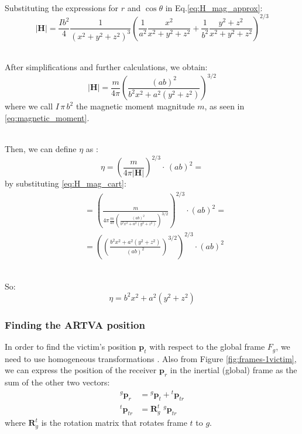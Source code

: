 \documentclass[main]{subfiles}
\begin{document}
\noindent\\
Substituting the expressions for \(r\) and \(\cos\theta\) in Eq.\ref{eq:H_mag_approx}:
\[
\left| \mathbf{H} \right| = \frac{I b^2}{4} \frac{1}{(x^2 + y^2 + z^2)^{3}} \left(\frac{1}{a^2} \frac{x^2}{x^2 + y^2 + z^2} + \frac{1}{b^2} \frac{y^2 + z^2}{x^2 + y^2 + z^2}\right)^{2/3}
\]

\noindent\\
After simplifications and further calculations, we obtain:
\begin{equation}
    \left| \mathbf{H} \right| = \frac{m}{4 \pi} \left(\frac{(ab)^2}{b^2 x^2 + a^2 (y^2 + z^2)}\right)^{3/2}
    \label{eq:H_mag_cart}
\end{equation}
where we call $I \, \pi \, b^2$ the magnetic moment magnitude $m$, as seen in \ref{eq:magnetic_moment}.

\noindent\\
Then, we can define $\eta$ as \cite{main}:
\[ \eta = \left( \frac{m}{4 \pi \left| \mathbf{H} \right|} \right)^{2/3} \cdot \, (ab)^2 = \]
by substituting \ref{eq:H_mag_cart}:
\[
\begin{aligned}
&= \left( \frac{m}{4 \pi \frac{m}{4 \pi} \left(\frac{(ab)^2}{b^2 x^2 + a^2 (y^2 + z^2)}\right)^{3/2}} \right)^{2/3} \cdot (ab)^2 = 
\\
&= \left( \left(\frac{b^2 x^2 + a^2 (y^2 + z^2)}{(ab)^2}\right)^{3/2}\right)^{2/3} \cdot (ab)^2
\end{aligned}
\]

\noindent\\
So:
\begin{equation}
    \eta = b^2 x^2 + a^2 (y^2 + z^2)
    \label{eq:eta}
\end{equation}

\subsubsection{Finding the ARTVA position}
In order to find the victim's position $\mathbf{p}_t$ with respect to the global frame $F_g$, we need to use homogeneous transformations \cite{book-robotics}. 
Also from Figure \ref{fig:frames-1victim}, we can express the position of the receiver $\mathbf{p}_r$ in the inertial (global) frame as the sum of the other two vectors:
\[
\begin{aligned}
{}^g \mathbf{p}_r &= {}^g \mathbf{p}_t + {}^t \mathbf{p}_{tr} \\
{}^t \mathbf{p}_{tr} &= \mathbf{R}_g^t \,\, {}^g \mathbf{p}_{tr}
\end{aligned}
\]
where $\mathbf{R}_g^t$ is the rotation matrix that rotates frame $t$ to $g$.
\end{document}
